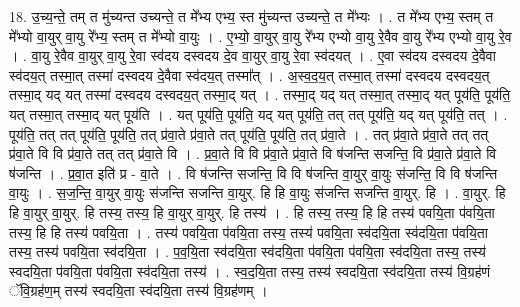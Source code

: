 \documentclass[17pt]{extarticle}
\begin{document}
18. उ॒च्य॒न्ते॒ तम् त मु॑च्यन्त उच्यन्ते॒ त मे᳚भ्य एभ्य॒ स्त मु॑च्यन्त उच्यन्ते॒ त मे᳚भ्यः । . त मे᳚भ्य एभ्य॒ स्तम् त मे᳚भ्यो वा॒युर् वा॒यु रे᳚भ्य॒ स्तम् त मे᳚भ्यो वा॒युः । . ए॒भ्यो॒ वा॒युर् वा॒यु रे᳚भ्य एभ्यो वा॒यु रे॒वैव वा॒यु रे᳚भ्य एभ्यो वा॒यु रे॒व । . वा॒यु रे॒वैव वा॒युर् वा॒यु रे॒वा स्व॑दय दस्वदय दे॒व वा॒युर् वा॒यु रे॒वा स्व॑दयत् । . ए॒वा स्व॑दय दस्वदय दे॒वैवा स्व॑दय॒त् तस्मा॒त् तस्मा॑ दस्वदय दे॒वैवा स्व॑दय॒त् तस्मा᳚त् । . अ॒स्व॒द॒य॒त् तस्मा॒त् तस्मा॑ दस्वदय दस्वदय॒त् तस्मा॒द् यद् यत् तस्मा॑ दस्वदय दस्वदय॒त् तस्मा॒द् यत् । . तस्मा॒द् यद् यत् तस्मा॒त् तस्मा॒द् यत् पूय॑ति॒ पूय॑ति॒ यत् तस्मा॒त् तस्मा॒द् यत् पूय॑ति । . यत् पूय॑ति॒ पूय॑ति॒ यद् यत् पूय॑ति॒ तत् तत् पूय॑ति॒ यद् यत् पूय॑ति॒ तत् । . पूय॑ति॒ तत् तत् पूय॑ति॒ पूय॑ति॒ तत् प्र॑वा॒ते प्र॑वा॒ते तत् पूय॑ति॒ पूय॑ति॒ तत् प्र॑वा॒ते । . तत् प्र॑वा॒ते प्र॑वा॒ते तत् तत् प्र॑वा॒ते वि वि प्र॑वा॒ते तत् तत् प्र॑वा॒ते वि । . प्र॒वा॒ते वि वि प्र॑वा॒ते प्र॑वा॒ते वि ष॑जन्ति सजन्ति॒ वि प्र॑वा॒ते प्र॑वा॒ते वि ष॑जन्ति । . प्र॒वा॒त इति॑ प्र - वा॒ते । . वि ष॑जन्ति सजन्ति॒ वि वि ष॑जन्ति वा॒युर् वा॒युः स॑जन्ति॒ वि वि ष॑जन्ति वा॒युः । . स॒ज॒न्ति॒ वा॒युर् वा॒युः स॑जन्ति सजन्ति वा॒युर्. हि हि वा॒युः स॑जन्ति सजन्ति वा॒युर्. हि । . वा॒युर्. हि हि वा॒युर् वा॒युर्. हि तस्य॒ तस्य॒ हि वा॒युर् वा॒युर्. हि तस्य॑ । . हि तस्य॒ तस्य॒ हि हि तस्य॑ पवयि॒ता प॑वयि॒ता तस्य॒ हि हि तस्य॑ पवयि॒ता । . तस्य॑ पवयि॒ता प॑वयि॒ता तस्य॒ तस्य॑ पवयि॒ता स्व॑दयि॒ता स्व॑दयि॒ता प॑वयि॒ता तस्य॒ तस्य॑ पवयि॒ता स्व॑दयि॒ता । . प॒व॒यि॒ता स्व॑दयि॒ता स्व॑दयि॒ता प॑वयि॒ता प॑वयि॒ता स्व॑दयि॒ता तस्य॒ तस्य॑ स्वदयि॒ता प॑वयि॒ता प॑वयि॒ता स्व॑दयि॒ता तस्य॑ । . स्व॒द॒यि॒ता तस्य॒ तस्य॑ स्वदयि॒ता स्व॑दयि॒ता तस्य॑ वि॒ग्रह॑णं ॅवि॒ग्रह॑ण॒म् तस्य॑ स्वदयि॒ता स्व॑दयि॒ता तस्य॑ वि॒ग्रह॑णम् । \newline
\end{document}
